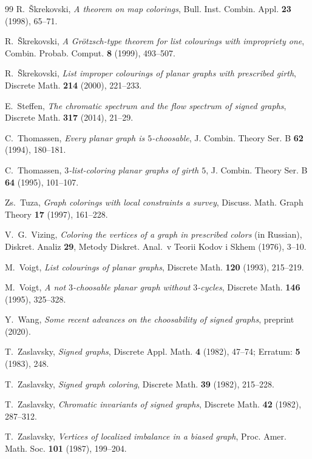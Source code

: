 \documentclass[11pt,a4paper]{article}
\theoremstyle{plain}
\theoremstyle{definition}
\begin{document}
\begin{thebibliography}{99}
R.~\v{S}krekovski,
\emph{A theorem on map colorings},
Bull. Inst. Combin. Appl. \textbf{23} (1998), 65--71.

R.~\v{S}krekovski,
\emph{A Gr\"otzsch-type theorem for list colourings with impropriety one},
Combin. Probab. Comput. \textbf{8} (1999), 493--507.

R.~\v{S}krekovski,
\emph{List improper colourings of planar graphs with prescribed girth},
Discrete Math. \textbf{214} (2000), 221--233.

E.~Steffen,
\emph{The chromatic spectrum and the flow spectrum of signed graphs},
Discrete Math. \textbf{317} (2014), 21--29.

C.~Thomassen,
\emph{Every planar graph is $5$-choosable},
J. Combin. Theory Ser. B \textbf{62} (1994), 180--181.

C.~Thomassen,
\emph{$3$-list-coloring planar graphs of girth $5$},
J. Combin. Theory Ser. B \textbf{64} (1995), 101--107.

Zs.~Tuza,
\emph{Graph colorings with local constraints  a survey},
Discuss. Math. Graph Theory \textbf{17} (1997), 161--228.

V.~G.~Vizing,
\emph{Coloring the vertices of a graph in prescribed colors} (in Russian),
Diskret. Analiz \textbf{29}, Metody Diskret. Anal.\ v Teorii Kodov i Skhem (1976), 3--10.

M.~Voigt,
\emph{List colourings of planar graphs},
Discrete Math. \textbf{120} (1993), 215--219.

M.~Voigt,
\emph{A not $3$-choosable planar graph without $3$-cycles},
Discrete Math. \textbf{146} (1995), 325--328.

Y.~Wang,
\emph{Some recent advances on the choosability of signed graphs},
preprint (2020).

T.~Zaslavsky,
\emph{Signed graphs},
Discrete Appl. Math. \textbf{4} (1982), 47--74; Erratum: \textbf{5} (1983), 248.

T.~Zaslavsky,
\emph{Signed graph coloring},
Discrete Math. \textbf{39} (1982), 215--228.

T.~Zaslavsky,
\emph{Chromatic invariants of signed graphs},
Discrete Math. \textbf{42} (1982), 287--312.

T.~Zaslavsky,
\emph{Vertices of localized imbalance in a biased graph},
Proc. Amer. Math. Soc. \textbf{101} (1987), 199--204.

\end{thebibliography}
\end{document}
